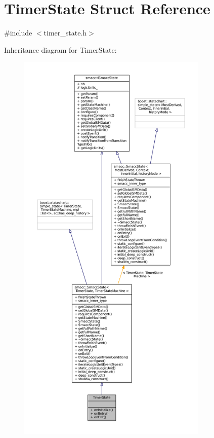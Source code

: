 \hypertarget{structTimerState}{}\section{Timer\+State Struct Reference}
\label{structTimerState}


{\ttfamily \#include $<$timer\+\_\+state.\+h$>$}



Inheritance diagram for Timer\+State\+:
\nopagebreak
\begin{figure}[H]
\begin{center}
\leavevmode
\includegraphics[height=550pt]{structTimerState__inherit__graph}
\end{center}
\end{figure}


